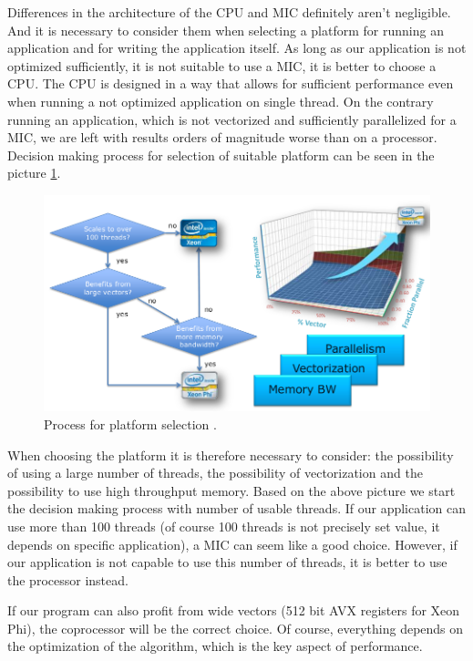Differences in the architecture of the CPU and MIC definitely aren't negligible. And it is necessary to consider them when selecting a platform for running an application and for writing the application itself. As long as our application is not optimized sufficiently, it is not suitable to use a MIC, it is better to choose a CPU. The CPU is designed in a way that allows for sufficient performance even when running a not optimized application on single thread. On the contrary running an application, which is not vectorized and sufficiently parallelized for a MIC, we are left with results orders of magnitude worse than on a processor. Decision making process for selection of suitable platform can be seen in the picture \ref{fig:platform_selection}.

\begin{figure}[htb]
    \centering
    \includegraphics[width=0.7\linewidth]{fig/platform_selection.png}
    \caption{Process for platform selection \cite{xeon_phi_book}.}
    \label{fig:platform_selection}
\end{figure} 

When choosing the platform it is therefore necessary to consider: the possibility of using a large number of threads, the possibility of vectorization and the possibility to use high throughput memory. Based on the above picture we start the decision making process with number of usable threads. If our application can use more than 100 threads (of course 100 threads is not precisely set value, it depends on specific application), a MIC can seem like a good choice. However, if our application is not capable to use this number of threads, it is better to use the processor instead.

\par If our program can also profit from wide vectors (512 bit AVX registers for Xeon Phi), the coprocessor will be the correct choice. Of course, everything depends on the optimization of the algorithm, which is the key aspect of performance.

